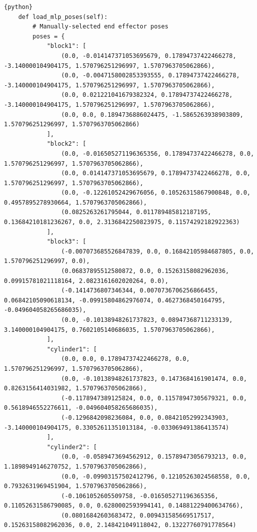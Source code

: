 \documentclass[11pt, a4paper]{report}
\begin{document}
\begin{lstlisting}{python}
    def load_mlp_poses(self):
        # Manually-selected end effector poses
        poses = {
            "block1": [
                (0.0, -0.014147371053695679, 0.17894737422466278, -3.140000104904175, 1.570796251296997, 1.5707963705062866),
                (0.0, -0.0047158002853393555, 0.17894737422466278, -3.140000104904175, 1.570796251296997, 1.5707963705062866),
                (0.0, 0.021221041679382324, 0.17894737422466278, -3.140000104904175, 1.570796251296997, 1.5707963705062866),
                (0.0, 0.0, 0.1894736886024475, -1.5865263938903809, 1.570796251296997, 1.5707963705062866)
            ],
            "block2": [
                (0.0, -0.016505271196365356, 0.17894737422466278, 0.0, 1.570796251296997, 1.5707963705062866),
                (0.0, 0.014147371053695679, 0.17894737422466278, 0.0, 1.570796251296997, 1.5707963705062866),
                (0.0, -0.12261052429676056, 0.10526315867900848, 0.0, 0.4957895278930664, 1.5707963705062866),
                (0.0825263261795044, 0.011789485812187195, 0.13684210181236267, 0.0, 2.3136842250823975, 0.11574292182922363)
            ],
            "block3": [
                (-0.007073685526847839, 0.0, 0.16842105984687805, 0.0, 1.570796251296997, 0.0),
                (0.06837895512580872, 0.0, 0.15263158082962036, 0.09915781021118164, 2.0823161602020264, 0.0),
                (-0.1414736807346344, 0.0070736706256866455, 0.06842105090618134, -0.09915804862976074, 0.4627368450164795, -0.049604058265686035),
                (0.0, -0.10138948261737823, 0.08947368711233139, 3.140000104904175, 0.7602105140686035, 1.5707963705062866),
            ],
            "cylinder1": [
                (0.0, 0.0, 0.17894737422466278, 0.0, 1.570796251296997, 1.5707963705062866),
                (0.0, -0.10138948261737823, 0.1473684161901474, 0.0, 0.8263156414031982, 1.5707963705062866),
                (-0.1178947389125824, 0.0, 0.11578947305679321, 0.0, 0.5618946552276611, -0.049604058265686035),
                (-0.1296842098236084, 0.0, 0.08421052992343903, -3.140000104904175, 0.33052611351013184, -0.033069491386413574)
            ],
            "cylinder2": [
                (0.0, -0.0589473694562912, 0.15789473056793213, 0.0, 1.1898949146270752, 1.5707963705062866),
                (0.0, -0.09903157502412796, 0.12105263024568558, 0.0, 0.7932631969451904, 1.5707963705062866),
                (-0.1061052605509758, -0.016505271196365356, 0.11052631586790085, 0.0, 0.6280002593994141, 0.14881229400634766),
                (0.08016842603683472, 0.009431585669517517, 0.15263158082962036, 0.0, 2.148421049118042, 0.13227760791778564)

\end{lstlisting}
\end{document}
